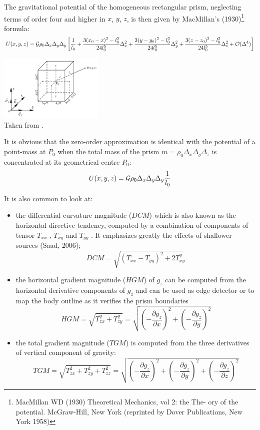 The gravitational potential of the homogeneous rectangular prism, 
neglecting terms of order four and higher in $x$, $y$, $z$, 
is then given by MacMillan’s (1930)\footnote{MacMillan WD (1930) Theoretical Mechanics, vol 2: the The-
ory of the potential. McGraw-Hill, New York (reprinted by Dover Publications, New York 1958)} formula:
\[
U(x,y,z) = {\cal G} \rho_0 \Delta_x \Delta_y \Delta_y
\left[
\frac{1}{l_0}
+ \frac{3(x_0-x)^2-l_0^2}{24l_0^5}\Delta_x^2
+ \frac{3(y-y_0)^2-l_0^2}{24l_0^5}\Delta_y^2
+ \frac{3(z-z_0)^2-l_0^2}{24l_0^5}\Delta_z^2
+ {\cal O}(\Delta^4)
\right]
\]

\begin{center}
\includegraphics[width=5cm]{images/gravity/hese07b}\\
{\captionfont Taken from \cite{hese07}.}
\end{center}

It is obvious that the zero-order approximation is 
identical with the potential of a point-mass at $P_0$ 
when the total mass of the prism $m=\rho_0 \Delta_x \Delta_y \Delta_z$ 
is concentrated at its geometrical centre $P_0$:
\[
U(x,y,z) = {\cal G} \rho_0 \Delta_x \Delta_y \Delta_y \frac{1}{l_0}
\]

It is also common \cite{duti16} to look at:
\begin{itemize}
\item the differential curvature magnitude ($DCM$) 
which is also known as the horizontal directive tendency, computed by a
combination of components of tensor $T_{xx}$ , $T_{xy}$ and $T_{yy}$ . 
It emphasizes greatly the effects of shallower sources (Saad, 2006);
\[
DCM=\sqrt{ (T_{xx}-T_{yy})^2+ 2 T_{xy}^2 }
\]
\item the horizontal gradient magnitude ($HGM$) of $g_z$ can be computed
from the horizontal derivative components of $g_z$ and can be used
as edge detector or to map the body outline as it verifies the prism
boundaries
\[
HGM=\sqrt{T_{zx}^2+T_{zy}^2} 
=\sqrt{ \left(-\frac{\partial g_z}{\partial x}\right)^2 
+ \left(-\frac{\partial g_z}{\partial y}\right)^2  }
\]

\item the total gradient magnitude ($TGM$) is
computed from the three derivatives of vertical component of gravity:
\[
TGM=\sqrt{T_{zx}^2+T_{zy}^2+T_{zz}^2}
=\sqrt{ \left(-\frac{\partial g_z}{\partial x}\right)^2 
+ \left(-\frac{\partial g_z}{\partial y}\right)^2  
+ \left(-\frac{\partial g_z}{\partial z}\right)^2  }
\]

\end{itemize}

